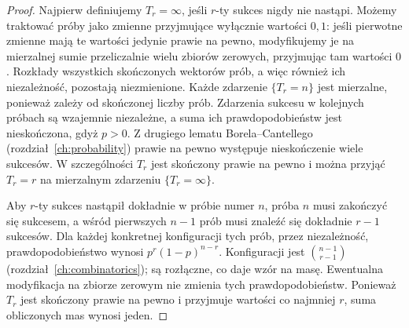 \begin{proof}
Najpierw definiujemy $T_r=\infty$, jeśli $r$-ty sukces
nigdy nie nastąpi. Możemy traktować próby jako zmienne
przyjmujące wyłącznie wartości $0,1$: jeśli pierwotne
zmienne mają te wartości jedynie prawie na pewno,
modyfikujemy je na mierzalnej sumie przeliczalnie wielu
zbiorów zerowych, przyjmując tam wartości $0$.
Rozkłady wszystkich skończonych wektorów prób,
a więc również ich niezależność, pozostają niezmienione. Każde zdarzenie $\{T_r=n\}$ jest
mierzalne, ponieważ zależy od skończonej liczby prób.
Zdarzenia sukcesu w kolejnych próbach są wzajemnie
niezależne, a suma ich prawdopodobieństw jest nieskończona,
gdyż $p>0$. Z drugiego lematu Borela--Cantellego
(rozdział~\ref{ch:probability}) prawie na pewno występuje
nieskończenie wiele sukcesów. W szczególności $T_r$ jest
skończony prawie na pewno i można przyjąć $T_r=r$ na
mierzalnym zdarzeniu $\{T_r=\infty\}$.

Aby $r$-ty sukces nastąpił dokładnie w próbie numer $n$,
próba $n$ musi zakończyć się sukcesem, a wśród pierwszych
$n-1$ prób musi znaleźć się dokładnie $r-1$ sukcesów.
Dla każdej konkretnej konfiguracji tych prób, przez
niezależność, prawdopodobieństwo wynosi
$p^r(1-p)^{n-r}$. Konfiguracji jest
$\binom{n-1}{r-1}$ (rozdział~\ref{ch:combinatorics});
są rozłączne, co daje wzór na masę. Ewentualna modyfikacja
na zbiorze zerowym nie zmienia tych prawdopodobieństw.
Ponieważ $T_r$ jest skończony prawie na pewno i przyjmuje
wartości co najmniej $r$, suma obliczonych mas wynosi jeden.


\end{proof}
